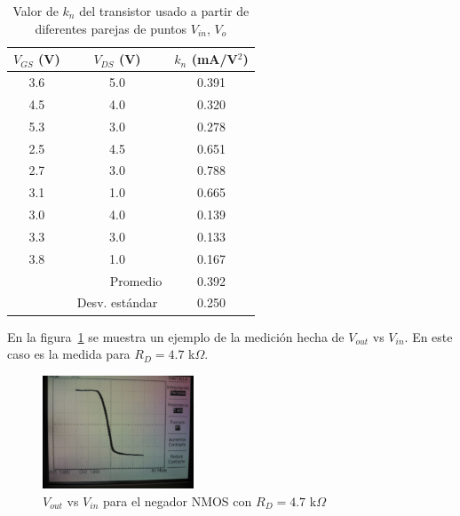 \documentclass[twocolumn]{IEEEtran}
\begin{document}
\begin{table}[h]
	\renewcommand{\arraystretch}{1.1}
	\caption{Valor de $k_n$ del transistor usado a partir de diferentes parejas de puntos $V_{in}$, $V_{o}$}
	\label{t1p1}
	\centering
	\begin{tabular}{|c|c|c|}
	\hline
	\bf $V_{GS}$ (V) & \bf $V_{DS}$ (V) & \bf $k_n$ (mA/V$^2$) \\
	\hline
	3.6 & 5.0 & 0.391	\\ \hline 
	4.5 & 4.0 & 0.320	\\ \hline
	5.3 & 3.0 & 0.278	\\ \hline \hline
	2.5 & 4.5 & 0.651	\\ \hline
	2.7 & 3.0 & 0.788   \\ \hline
	3.1 & 1.0 & 0.665   \\\hline \hline
	3.0 & 4.0 & 0.139   \\ \hline
	3.3 & 3.0 & 0.133   \\\hline
	3.8 & 1.0 & 0.167   \\ \hline \hline
	    & \ \ \ \ \ \  Promedio  & 	0.392	\\ \hline 
		& Desv. estándar & 0.250	\\ \hline 
	
	\end{tabular}
\end{table}

En la figura~\ref{p1ff22} se muestra un ejemplo de la medición hecha de $V_{out}$ vs $V_{in}$. En este caso es la medida para $R_D=4.7$ k$\Omega$.



\begin{figure}[H]%
\centering
	\includegraphics[width=0.40\textwidth]{pics/WP_000070.jpg}
	\caption{$V_{out}$ vs $V_{in}$ para el negador NMOS con $R_D=4.7$ k$\Omega$}
	
	\label{p1ff22}

\end{figure}
\end{document}
